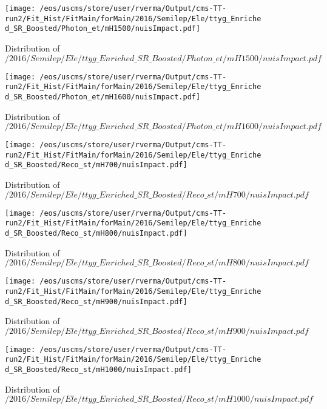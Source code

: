 \begin{figure}
\centering
\texttt{[image: /eos/uscms/store/user/rverma/Output/cms-TT-run2/Fit\_Hist/FitMain/forMain/2016/Semilep/Ele/ttyg\_Enriched\_SR\_Boosted/Photon\_et/mH1500/nuisImpact.pdf]}
\caption{Distribution of $/2016/Semilep/Ele/ttyg\_Enriched\_SR\_Boosted/Photon\_et/mH1500/nuisImpact.pdf$}
\end{figure}

\begin{figure}
\centering
\texttt{[image: /eos/uscms/store/user/rverma/Output/cms-TT-run2/Fit\_Hist/FitMain/forMain/2016/Semilep/Ele/ttyg\_Enriched\_SR\_Boosted/Photon\_et/mH1600/nuisImpact.pdf]}
\caption{Distribution of $/2016/Semilep/Ele/ttyg\_Enriched\_SR\_Boosted/Photon\_et/mH1600/nuisImpact.pdf$}
\end{figure}

\begin{figure}
\centering
\texttt{[image: /eos/uscms/store/user/rverma/Output/cms-TT-run2/Fit\_Hist/FitMain/forMain/2016/Semilep/Ele/ttyg\_Enriched\_SR\_Boosted/Reco\_st/mH700/nuisImpact.pdf]}
\caption{Distribution of $/2016/Semilep/Ele/ttyg\_Enriched\_SR\_Boosted/Reco\_st/mH700/nuisImpact.pdf$}
\end{figure}

\begin{figure}
\centering
\texttt{[image: /eos/uscms/store/user/rverma/Output/cms-TT-run2/Fit\_Hist/FitMain/forMain/2016/Semilep/Ele/ttyg\_Enriched\_SR\_Boosted/Reco\_st/mH800/nuisImpact.pdf]}
\caption{Distribution of $/2016/Semilep/Ele/ttyg\_Enriched\_SR\_Boosted/Reco\_st/mH800/nuisImpact.pdf$}
\end{figure}

\begin{figure}
\centering
\texttt{[image: /eos/uscms/store/user/rverma/Output/cms-TT-run2/Fit\_Hist/FitMain/forMain/2016/Semilep/Ele/ttyg\_Enriched\_SR\_Boosted/Reco\_st/mH900/nuisImpact.pdf]}
\caption{Distribution of $/2016/Semilep/Ele/ttyg\_Enriched\_SR\_Boosted/Reco\_st/mH900/nuisImpact.pdf$}
\end{figure}

\begin{figure}
\centering
\texttt{[image: /eos/uscms/store/user/rverma/Output/cms-TT-run2/Fit\_Hist/FitMain/forMain/2016/Semilep/Ele/ttyg\_Enriched\_SR\_Boosted/Reco\_st/mH1000/nuisImpact.pdf]}
\caption{Distribution of $/2016/Semilep/Ele/ttyg\_Enriched\_SR\_Boosted/Reco\_st/mH1000/nuisImpact.pdf$}
\end{figure}


